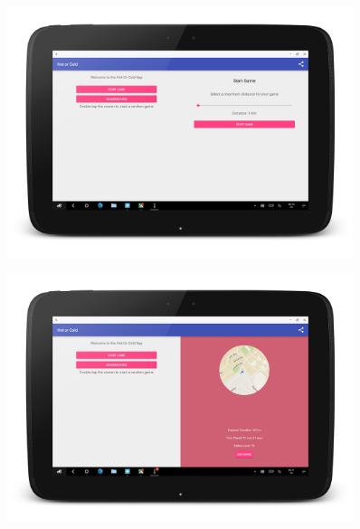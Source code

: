 \documentclass[10pt, a4paper]{article}
\begin{document}
\begin{figure}[!htb]
%
\begin{center}
  \includegraphics[width=0.9\textwidth]{tablet_startgame_1}
  \caption{}
\end{center}
\endminipage
\end{figure}

\begin{figure}[!htb]
%
\begin{center}
  \includegraphics[width=0.9\textwidth]{tablet_startgame_2}
  \caption{}
\end{center}
\endminipage
\end{figure}
\end{document}
